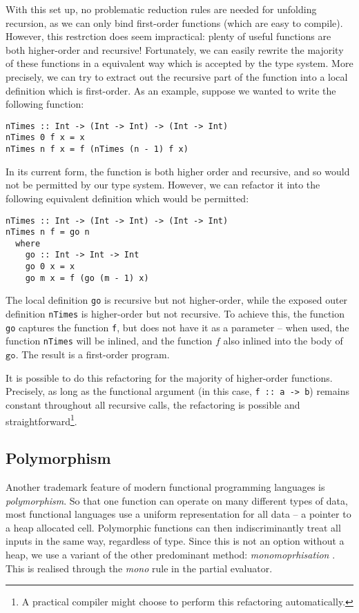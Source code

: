 \documentclass[runningheads]{llncs}
\begin{document}
With this set up, no problematic reduction rules are needed for unfolding recursion, as we can only bind first-order functions (which are easy to compile). However, this restrction does seem impractical: plenty of useful functions are both higher-order and recursive! Fortunately, we can easily rewrite the majority of these functions in a equivalent way which is accepted by the type system. More precisely, we can try to extract out the recursive part of the function into a local definition which is first-order. As an example, suppose we wanted to write the following function:

\begin{verbatim}
nTimes :: Int -> (Int -> Int) -> (Int -> Int)
nTimes 0 f x = x
nTimes n f x = f (nTimes (n - 1) f x)
\end{verbatim}

In its current form, the function is both higher order and recursive, and so would not be permitted by our type system. However, we can refactor it into the following equivalent definition which would be permitted:

\begin{verbatim}
nTimes :: Int -> (Int -> Int) -> (Int -> Int)
nTimes n f = go n
  where
    go :: Int -> Int -> Int
    go 0 x = x
    go m x = f (go (m - 1) x)
\end{verbatim}

The local definition \texttt{go} is recursive but not higher-order, while the exposed outer definition \texttt{nTimes} is higher-order but not recursive. To achieve this, the function \texttt{go} captures the function \texttt{f}, but does not have it as a parameter -- when used, the function \texttt{nTimes} will be inlined, and the function $f$ also inlined into the body of $\texttt{go}$. The result is a first-order program.

It is possible to do this refactoring for the majority of higher-order functions. Precisely, as long as the functional argument (in this case, \texttt{f :: a -> b}) remains constant throughout all recursive calls, the refactoring is possible and straightforward\footnote{A practical compiler might choose to perform this refactoring automatically.}.

\subsection{Polymorphism} \label{sec:polymorphism}

Another trademark feature of modern functional programming languages is \emph{polymorphism}. So that one function can operate on many different types of data, most functional languages use a uniform representation for all data -- a pointer to a heap allocated cell. Polymorphic functions can then indiscriminantly treat all inputs in the same way, regardless of type. Since this is not an option without a heap, we use a variant of the other predominant method: \emph{monomoprhisation} \cite{lutze2025simple}. This is realised through the \textit{\scriptsize mono} rule in the partial evaluator.
\end{document}
